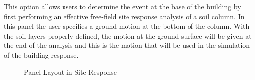 This option allows users to determine the event at the base of the 
building by first performing an effective free-field  site response 
analysis of a soil column. In this panel the user specifies a ground 
motion at the bottom of the column. With the soil layers properly 
defined, the motion at the ground surface will be given at the end 
of the analysis and this is the motion that will be used in the 
simulation of the building response. 

\begin{figure}[!htbp]
  \caption{Panel Layout in Site Response}
  \label{fig:s3hark1}
\end{figure}

